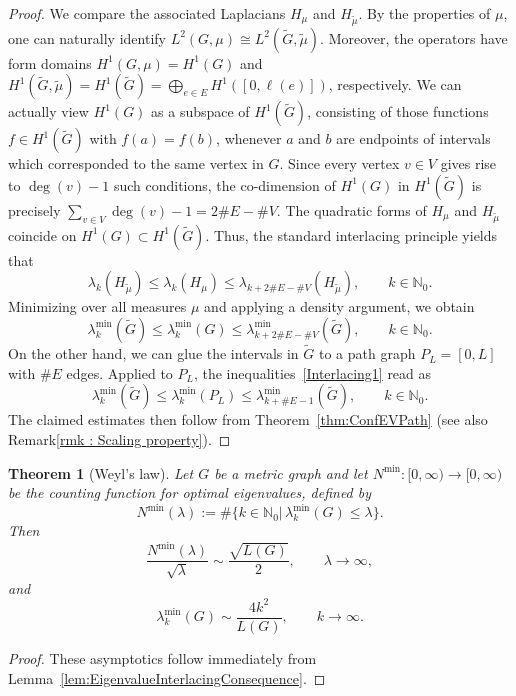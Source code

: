 \documentclass[reqno]{amsart}
\theoremstyle{plain}
\newtheorem{thm}{Theorem}[section]
\theoremstyle{definition}
\theoremstyle{remark}
\numberwithin{equation}{section}
\newcommand{\N}{\mathbb{N}}     %
\begin{document}
\begin{proof}
	We compare the associated Laplacians $H_\mu$ and $H_{\tilde \mu}$. By the properties of $\mu$, one can naturally identify $L^2(G, \mu) \cong L^2(\widetilde G, \widetilde\mu)$. Moreover, the operators have form domains $H^1(G, \mu) = H^1(G)$ and $H^1(\widetilde G, \widetilde \mu) = H^1(\widetilde G) = \bigoplus_{e \in E} H^1([0, \ell(e)])$, respectively. We can actually view $H^1(G)$ as a subspace of $H^1(\widetilde G)$, consisting of those functions $f \in H^1(\widetilde G)$ with $f(a) = f(b)$, whenever $a$ and $b$ are endpoints of intervals which corresponded to the same vertex in $G$. Since every vertex $v \in V$ gives rise to $\deg(v) -1$ such conditions, the co-dimension of $H^1(G)$ in $H^1(\widetilde G)$ is precisely $\sum_{v \in V} \deg(v)-1 = 2 \#E - \#V$. The quadratic forms of $H_\mu$ and $H_{\tilde \mu}$ coincide on $H^1(G) \subset H^1(\widetilde G)$.  Thus, the standard interlacing principle yields that
	\[
	\lambda_k (  H_{\widetilde \mu} )  \le \lambda_k (H_\mu) \le \lambda_{k + 2\#E - \#V} (H_{\widetilde \mu}), \qquad k \in \N_{0}.
	\]
	Minimizing over all measures $\mu$ and applying a density argument, we obtain
	\begin{equation} \label{Interlacing1}
		\lambda_k^{\min}(\widetilde G)  \le \lambda_k^{\min}(G) \le \lambda_{k + 2\#E - \#V}^{\min}(\widetilde G), \qquad k \in \N_0.
	\end{equation}
	On the other hand, we can glue the intervals in $\widetilde G$ to a path graph $P_L = [0,L]$ with $\#E$ edges.  Applied to $P_L$, the inequalities~\eqref{Interlacing1} read as
	\begin{equation} \label{Interlacing2}
		\lambda_k^{\min}(\widetilde G)  \le \lambda_k^{\min}( P_L) \le \lambda_{k + \#E -1}^{\min}(\widetilde G), \qquad k \in \N_0.
	\end{equation}
	The claimed estimates then follow from Theorem~\ref{thm:ConfEVPath} (see also Remark\ref{rmk : Scaling property}).
\end{proof}


\begin{thm}[Weyl's law] \label{thm:Weyl'sLaw}
	Let $G$ be a metric graph and let $N^{\min} \colon [0, \infty) \to [0, \infty)$ be the counting function for optimal eigenvalues, defined by
	\[
	N^{\min}(\lambda) := \#  \big  \{k \in \N_0|\, \lambda_k^{\min}(G) \le \lambda \big \}.
	\]
	Then
	\begin{equation} \label{eq:Weyl2}
		\frac{N^{\min}(\lambda)}{\sqrt{\lambda}}  \sim \frac{\sqrt{L(G) }}{2}, \qquad \lambda \to \infty,
	\end{equation}
	and
	\begin{equation} \label{eq:Weyl1}
		\lambda_k^{\min}(G) \sim \frac{4 k^2}{L(G)}, \qquad k \to \infty.
	\end{equation}
\end{thm}
\begin{proof}
	These asymptotics follow immediately from Lemma~\ref{lem:EigenvalueInterlacingConsequence}. 
\end{proof}
\end{document}
